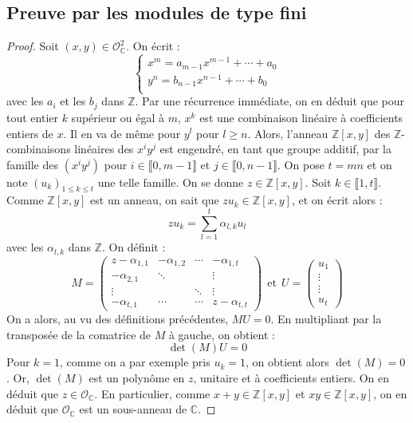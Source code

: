 \documentclass[french]{article}
\newcommand{\Z}{\mathbb{Z}}
\newcommand{\C}{\mathbb{C}}
\theoremstyle{definition}
\theoremstyle{theorem}
\theoremstyle{remark}
\begin{document}
\subsection{Preuve par les modules de type fini}
\begin{proof}
	Soit $(x,y)\in\mathcal{O}_\C^2$. On écrit : $$\begin{cases}
		x^m=a_{m-1}x^{m-1}+\cdots+a_0 \\
		y^n=b_{n-1}x^{n-1}+\cdots+b_0 \\
	\end{cases}$$ avec les $a_i$ et les $b_j$ dans $\Z$. Par une récurrence immédiate, on en déduit que pour tout entier $k$ supérieur ou égal à $m$, $x^k$ est une combinaison linéaire à coefficients entiers de $x$. Il en va de même pour $y^l$ pour $l\geqslant n$. Alors, l'anneau $\Z[x,y]$ des $\Z$-combinaisons linéaires des $x^i y^j$ est engendré, en tant que groupe additif, par la famille des $(x^iy^j)$ pour $i\in\llbracket0,m-1\rrbracket$ et $j\in\llbracket0,n-1\rrbracket$. On pose $t=mn$ et on note $(u_k)_{1\leqslant k\leqslant t}$ une telle famille. On se donne $z\in\Z[x,y]$. Soit $k\in\llbracket1,t\rrbracket$. Comme $\Z[x,y]$ est un anneau, on sait que $zu_k\in\Z[x,y]$, et on écrit alors : $$zu_k=\sum_{l=1}^{t}\alpha_{l,k}u_l$$ avec les $\alpha_{l,k}$ dans $\Z$. On définit : $$M=\begin{pmatrix}
	z-\alpha_{1,1}&-\alpha_{1,2}&\cdots&-\alpha_{1,t}\\
	-\alpha_{2,1}&\ddots&&\vdots\\
	\vdots&&\ddots&\vdots\\
	-\alpha_{t,1}&\cdots&\cdots&z-\alpha_{t,t}
	\end{pmatrix}\ \ \text{et}\ \ U=\begin{pmatrix}
	u_1\\
	\vdots\\ 
	\vdots\\
	u_t
	\end{pmatrix}$$ On a alors, au vu des définitions précédentes, $MU=0$. En multipliant par la transposée de la comatrice de $M$ à gauche, on obtient : $$\det(M)U=0$$ Pour $k=1$, comme on a par exemple pris $u_k=1$, on obtient alors $\det(M)=0$. Or, $\det(M)$ est un polynôme en $z$, unitaire et à coefficients entiers. On en déduit que $z\in\mathcal{O}_\C$. En particulier, comme $x+y\in\Z[x,y]$ et $xy\in\Z[x,y]$, on en déduit que $\mathcal{O}_\C$ est un sous-anneau de $\C$.
\end{proof}
\end{document}
